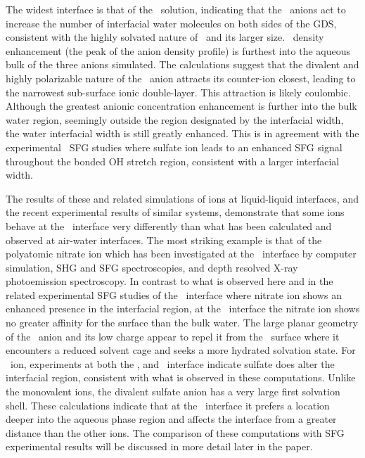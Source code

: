 The widest interface is that of the \sodsul~solution, indicating that the \sul~anions act to increase the number of interfacial water molecules on both sides of the GDS, consistent with the highly solvated nature of \sul~and its larger size. \sul~density enhancement (the peak of the anion density profile) is furthest into the aqueous bulk of the three anions simulated. The calculations suggest that the divalent and highly polarizable nature of the \sul~anion attracts its counter-ion closest, leading to the narrowest sub-surface ionic double-layer. This attraction is likely coulombic. Although the greatest anionic concentration enhancement is further into the bulk water region, seemingly outside the region designated by the interfacial width, the water interfacial width is still greatly enhanced. This is in agreement with the experimental \sodsul~SFG studies where sulfate ion leads to an enhanced SFG signal throughout the bonded OH stretch region, consistent with a larger interfacial width.\cite{McFearin2009}

The results of these and related simulations of ions at liquid-liquid interfaces, and the recent experimental results of similar systems, demonstrate that some ions behave at the \ctcwat~interface very differently than what has been calculated and observed at air-water interfaces.\cite{Wick2006,Wick2007a,Jungwirth2006a} The most striking example is that of the polyatomic nitrate ion which has been investigated at the \airwat~interface by computer simulation,\cite{Miller2009,Thomas2007} SHG and SFG spectroscopies,\cite{Otten2007,Schnitzer2000,Xu2009} and depth resolved X-ray photoemission spectroscopy.\cite{Brown2009} In contrast to what is observed here and in the related experimental SFG studies of the \ctcwat~interface where nitrate ion shows an enhanced presence in the interfacial region, at the \airwat~interface the nitrate ion shows no greater affinity for the surface than the bulk water. The large planar geometry of the \nit~anion and its low charge appear to repel it from the \airwat~surface where it encounters a reduced solvent cage and seeks a more hydrated solvation state. For \sul~ion, experiments at both the \airwat,\cite{Gopalakrishnan2005} and \ctcwat~interface indicate sulfate does alter the interfacial region, consistent with what is observed in these computations. Unlike the monovalent ions, the divalent sulfate anion has a very large first solvation shell. These calculations indicate that at the \ctcwat~interface it prefers a location deeper into the aqueous phase region and affects the interface from a greater distance than the other ions. The comparison of these computations with SFG experimental results will be discussed in more detail later in the paper.

